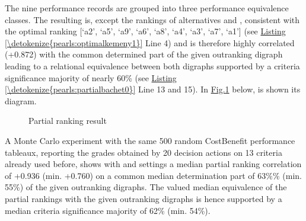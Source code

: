 \documentclass[a4paper,12pt,english]{sphinxhowto}
\let\sphinxpxdimen\pdfpxdimen\else\newdimen\sphinxpxdimen
\begin{document}
\sphinxAtStartPar
The nine performance records are grouped into three performance equivalence classes. The resulting  is, except the rankings of alternatives  and , consistent with the optimal  ranking {[}‘a2’, ‘a5’, ‘a9’, ‘a6’, ‘a8’, ‘a4’, ‘a3’, ‘a7’, ‘a1’{]} (see \hyperref[\detokenize{pearls:optimalkemeny1}]{Listing \ref{\detokenize{pearls:optimalkemeny1}}} Line 4) and is therefore highly correlated (+0.872) with the common determined part of the given outranking digraph   leading to a relational equivalence between both digraphs supported by a criteria significance majority of nearly 60\% (see \hyperref[\detokenize{pearls:partialbachet0}]{Listing \ref{\detokenize{pearls:partialbachet0}}} Line 13 and 15). In \hyperref[\detokenize{pearls:partialbachet1}]{Fig.\@ \ref{\detokenize{pearls:partialbachet1}}} below, is shown its  diagram.

\begin{sphinxVerbatim}[commandchars=\\\{\},numbers=left,firstnumber=1,stepnumber=1]
\end{sphinxVerbatim}

\begin{figure}[H]
\centering
\capstart

\noindent\sphinxincludegraphics[width=350\sphinxpxdimen]{{partialBachet1}.png}
\caption{Partial  ranking result}\label{\detokenize{pearls:partialbachet1}}\end{figure}

\sphinxAtStartPar
A Monte Carlo experiment with the same 500 random Cost\sphinxhyphen{}Benefit performance tableaux, reporting the grades obtained by 20 decision actions on 13 criteria already used before, shows with  and  settings a median partial ranking correlation of +0.936 (min. +0.760) on a common median determination part of 63\%\% (min. 55\%) of the given outranking digraphs. The valued median equivalence of the partial rankings with the given outranking digraphs is hence supported by a median criteria significance majority of 62\% (min. 54\%).
\end{document}
